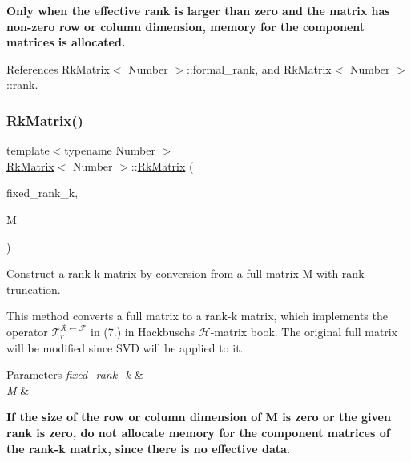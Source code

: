 {\bfseries Only when the effective rank is larger than zero and the matrix has non-\/zero row or column dimension, memory for the component matrices is allocated.}

References Rk\+Matrix$<$ Number $>$\+::formal\+\_\+rank, and Rk\+Matrix$<$ Number $>$\+::rank.

\mbox{\label{classRkMatrix_a6078a6d21d37f140ff8774b8310a19eb}} 
\subsubsection{\texorpdfstring{Rk\+Matrix()}{RkMatrix()}\hspace{0.1cm}{\footnotesize\ttfamily [3/18]}}
{\footnotesize\ttfamily template$<$typename Number $>$ \\
\hyperlink{classRkMatrix}{Rk\+Matrix}$<$ Number $>$\+::\hyperlink{classRkMatrix}{Rk\+Matrix} (\begin{DoxyParamCaption}\item[{const \hyperlink{classRkMatrix_add060bfc3a4cc77f858c3d6dd58cadd5}{size\+\_\+type}}]{fixed\+\_\+rank\+\_\+k,  }\item[{\hyperlink{classLAPACKFullMatrixExt}{L\+A\+P\+A\+C\+K\+Full\+Matrix\+Ext}$<$ Number $>$ \&}]{M }\end{DoxyParamCaption})}

Construct a rank-\/k matrix by conversion from a full matrix {\ttfamily M} with rank truncation.


\begin{DoxyDescription}
\item[Note ]This method converts a full matrix to a rank-\/k matrix, which implements the operator $\mathcal{T}_{r}^{\mathcal{R} \leftarrow \mathcal{F}}$ in (7.) in Hackbusch\textquotesingle{}s $\mathcal{H}$-\/matrix book. The original full matrix {\ttfamily will} be modified since S\+VD will be applied to it. 
\end{DoxyDescription}
\begin{DoxyParams}{Parameters}
{\em fixed\+\_\+rank\+\_\+k} & \\
\hline
{\em M} & \\
\hline
\end{DoxyParams}
{\bfseries If the size of the row or column dimension of {\ttfamily M} is zero or the given rank is zero, do not allocate memory for the component matrices of the rank-\/k matrix, since there is no effective data.}

